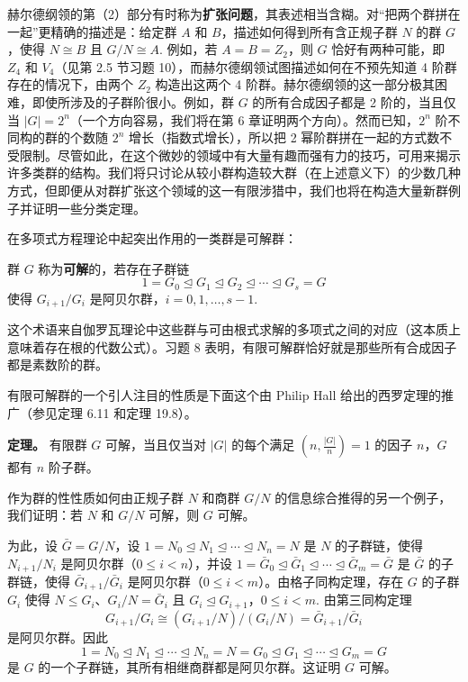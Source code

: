 赫尔德纲领的第（2）部分有时称为\textbf{扩张问题}，其表述相当含糊。对“把两个群拼在一起”更精确的描述是：给定群 \(A\) 和 \(B\)，描述如何得到所有含正规子群 \(N\) 的群 \(G\)，使得 \(N \cong B\) 且 \(G/N \cong A\). 例如，若 \(A = B = Z_2\)，则 \(G\) 恰好有两种可能，即 \(Z_4\) 和 \(V_4\)（见第 2.5 节习题 10），而赫尔德纲领试图描述如何在不预先知道 4 阶群存在的情况下，由两个 \(Z_2\) 构造出这两个 4 阶群。赫尔德纲领的这一部分极其困难，即使所涉及的子群阶很小。例如，群 \(G\) 的所有合成因子都是 2 阶的，当且仅当 \(|G| = 2^n\)（一个方向容易，我们将在第 6 章证明两个方向）。然而已知，\(2^n\) 阶不同构的群的个数随 \(2^n\) 增长（指数式增长），所以把 2 幂阶群拼在一起的方式数不受限制。尽管如此，在这个微妙的领域中有大量有趣而强有力的技巧，可用来揭示许多类群的结构。我们将只讨论从较小群构造较大群（在上述意义下）的少数几种方式，但即便从对群扩张这个领域的这一有限涉猎中，我们也将在构造大量新群例子并证明一些分类定理。

在多项式方程理论中起突出作用的一类群是可解群：

\begin{definition}
群 \(G\) 称为\textbf{可解}的，若存在子群链
\[
1 = G_0 \trianglelefteq G_1 \trianglelefteq G_2 \trianglelefteq \cdots \trianglelefteq G_s = G
\]
使得 \(G_{i+1}/G_i\) 是阿贝尔群，\(i = 0, 1, \ldots, s-1\).
\end{definition}

这个术语来自伽罗瓦理论中这些群与可由根式求解的多项式之间的对应（这本质上意味着存在根的代数公式）。习题 8 表明，有限可解群恰好就是那些所有合成因子都是素数阶的群。

有限可解群的一个引人注目的性质是下面这个由 Philip Hall 给出的西罗定理的推广（参见定理 6.11 和定理 19.8）。

\textbf{定理。} 有限群 \(G\) 可解，当且仅当对 \(|G|\) 的每个满足 \(\left(n, \frac{|G|}{n}\right) = 1\) 的因子 \(n\)，\(G\) 都有 \(n\) 阶子群。

作为群的性性质如何由正规子群 \(N\) 和商群 \(G/N\) 的信息综合推得的另一个例子，我们证明：若 \(N\) 和 \(G/N\) 可解，则 \(G\) 可解。

为此，设 \(\bar{G} = G/N\)，设 \(1 = N_0 \trianglelefteq N_1 \trianglelefteq \cdots \trianglelefteq N_n = N\) 是 \(N\) 的子群链，使得 \(N_{i+1}/N_i\) 是阿贝尔群（\(0 \le i < n\)），并设 \(1 = \bar{G}_0 \trianglelefteq \bar{G}_1 \trianglelefteq \cdots \trianglelefteq \bar{G}_m = \bar{G}\) 是 \(\bar{G}\) 的子群链，使得 \(\bar{G}_{i+1}/\bar{G}_i\) 是阿贝尔群（\(0 \le i < m\)）。由格子同构定理，存在 \(G\) 的子群 \(G_i\) 使得 \(N \leq G_i\)、\(G_i/N = \bar{G}_i\) 且 \(G_i \trianglelefteq G_{i+1}\)，\(0 \le i < m\). 由第三同构定理
\[
G_{i+1}/G_i \cong (G_{i+1}/N)/(G_i/N) = \bar{G}_{i+1}/\bar{G}_i
\]
是阿贝尔群。因此
\[
1 = N_0 \trianglelefteq N_1 \trianglelefteq \cdots \trianglelefteq N_n = N = G_0 \trianglelefteq G_1 \trianglelefteq \cdots \trianglelefteq G_m = G
\]
是 \(G\) 的一个子群链，其所有相继商群都是阿贝尔群。这证明 \(G\) 可解。

